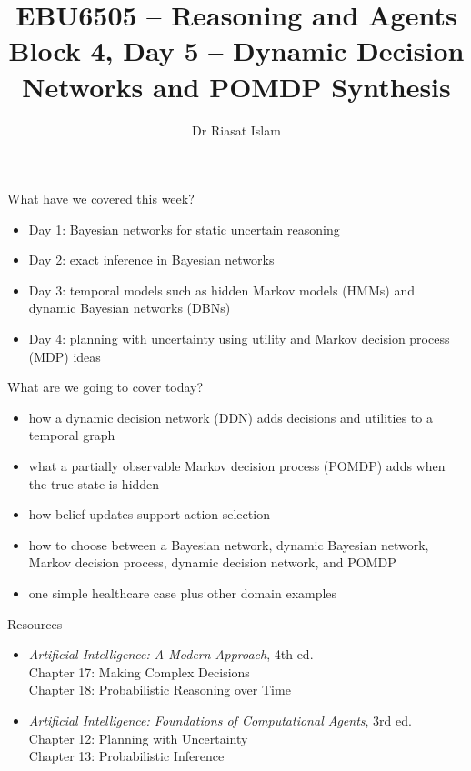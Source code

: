 \documentclass[aspectratio=169]{beamer}
\title[EBU6505 B4 D5]{EBU6505 -- Reasoning and Agents\\Block 4, Day 5 -- Dynamic Decision Networks and POMDP Synthesis}
\author{Dr Riasat Islam}
\institute{Queen Mary University of London}
\date{}
\newcommand{\defaultdeckrefs}{AIMA4e Ch.17--18; Poole3e Ch.12--14}
\newcommand{\currentsliderefs}{\defaultdeckrefs}
\newcommand{\setslideref}[1]{\gdef\currentsliderefs{#1}}
\begin{document}
\setslideref{AIMA4e Ch.17--18; Poole3e Ch.12--14}
\begin{frame}
  \titlepage
\end{frame}

\begin{frame}{What have we covered this week?}
\begin{itemize}
  \item Day 1: Bayesian networks for static uncertain reasoning
  \item Day 2: exact inference in Bayesian networks
  \item Day 3: temporal models such as hidden Markov models (HMMs) and dynamic Bayesian networks (DBNs)
  \item Day 4: planning with uncertainty using utility and Markov decision process (MDP) ideas
\end{itemize}
\end{frame}

\begin{frame}{What are we going to cover today?}
\begin{itemize}
  \item how a dynamic decision network (DDN) adds decisions and utilities to a temporal graph
  \item what a partially observable Markov decision process (POMDP) adds when the true state is hidden
  \item how belief updates support action selection
  \item how to choose between a Bayesian network, dynamic Bayesian network, Markov decision process, dynamic decision network, and POMDP
  \item one simple healthcare case plus other domain examples
\end{itemize}
\end{frame}

\begin{frame}{Resources}
\begin{itemize}
  \item \textit{Artificial Intelligence: A Modern Approach}, 4th ed.\\
  Chapter 17: Making Complex Decisions\\
  Chapter 18: Probabilistic Reasoning over Time
  \item \textit{Artificial Intelligence: Foundations of Computational Agents}, 3rd ed.\\
  Chapter 12: Planning with Uncertainty\\
  Chapter 13: Probabilistic Inference
\end{itemize}
\end{frame}
\end{document}
